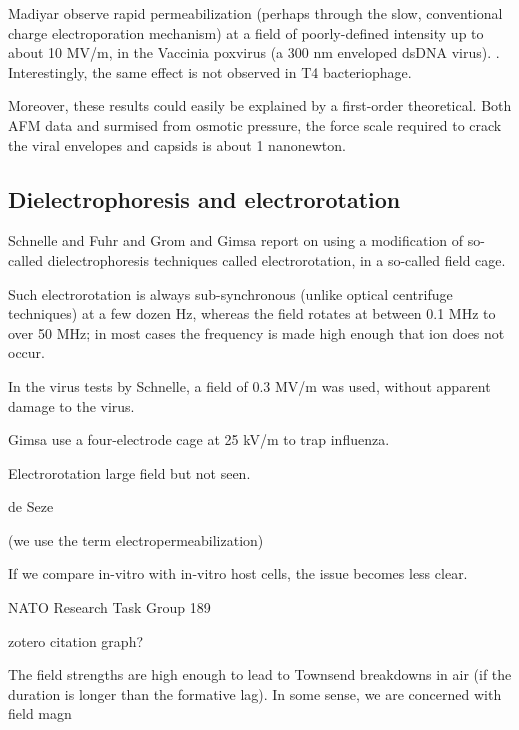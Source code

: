 \documentclass[paper.tex]{subfiles}
\begin{document}
\begin{multicols}{1}
Madiyar \cite{Manipulation2013} observe rapid permeabilization (perhaps through the slow, conventional charge electroporation mechanism) at a field of poorly-defined intensity up to about 10 MV/m, in the Vaccinia poxvirus (a 300 nm enveloped dsDNA virus). \cite{AC2017}. Interestingly, the same effect is not observed in T4 bacteriophage. 

Moreover, these results could easily be explained by a first-order theoretical. Both AFM data and surmised from osmotic pressure, the force scale required to crack the viral envelopes and capsids is about 1 nanonewton. 



\subsection{Dielectrophoresis and electrorotation}

Schnelle\cite{Trapping1996} and Fuhr\cite{Radiofrequency1994} and Grom \cite{Accumulation2006} and Gimsa \cite{New1999} report on using a modification of so-called dielectrophoresis techniques called electrorotation, in a so-called field cage.
 
 
Such electrorotation is always sub-synchronous (unlike optical centrifuge techniques) at a few dozen Hz, whereas the field rotates at between 0.1 MHz to over 50 MHz; in most cases the frequency is made high enough that ion does not occur.

In the virus tests by Schnelle, a field of 0.3 MV/m was used, without apparent damage to the virus.

Gimsa \cite{New1999} use a four-electrode cage at 25 kV/m to trap influenza.

Electrorotation large field but not seen.

de Seze





\pagebreak

(we use the term electropermeabilization)


If we compare in-vitro with in-vitro host cells, the issue becomes less clear.


NATO Research Task Group 189 \cite{treatyelectromagnetic}

zotero citation graph?


The field strengths are high enough to lead to Townsend breakdowns in air (if the duration is longer than the formative lag). In some sense, we are concerned with field magn


\end{multicols}
\end{document}
